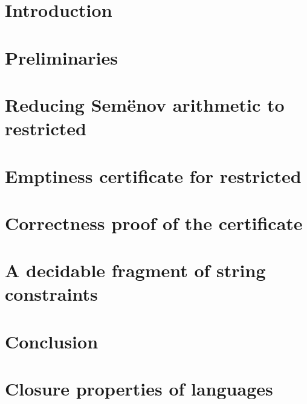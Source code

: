 \documentclass[UKenglish,cleveref, autoref, thm-restate]{lipics-v2021}
\begin{document}
\section{Introduction}


\section{Preliminaries}


\section{Reducing Sem{\"e}nov arithmetic to restricted \laVASS}\label{sec:semenov-to-lavass}



\section{Emptiness certificate for restricted \laVASS}\label{sec:emptiness-rlavass}


\section{Correctness proof of the certificate}


\section{A decidable fragment of string constraints}


\section{Conclusion}




\newpage

\onecolumn

\appendix
\section{Closure properties of \laVASS languages}

\end{document}
